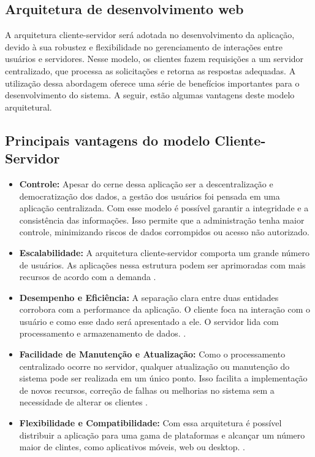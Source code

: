\subsection{Arquitetura de desenvolvimento web}

A arquitetura cliente-servidor será adotada no desenvolvimento da aplicação, devido à sua robustez e flexibilidade no gerenciamento de interações entre usuários e servidores. Nesse modelo, os clientes fazem requisições a um servidor centralizado, que processa as solicitações e retorna as respostas adequadas. A utilização dessa abordagem oferece uma série de benefícios importantes para o desenvolvimento do sistema. A seguir, estão algumas vantagens deste modelo arquitetural.

\subsection{Principais vantagens do modelo Cliente-Servidor}

\begin{itemize}
    \item \textbf{Controle:} Apesar do cerne dessa aplicação ser a descentralização e democratização dos dados, a gestão dos usuários foi pensada em uma aplicação centralizada. Com esse modelo é possível garantir a integridade e a consistência das informações. 
    Isso permite que a administração tenha maior controle, minimizando riscos de dados corrompidos ou acesso não autorizado\cite{coulouris2011}.
    
    \item \textbf{Escalabilidade:} A arquitetura cliente-servidor comporta um grande número de usuários. As aplicações nessa estrutura podem ser aprimoradas com mais recursos de acordo com a demanda \cite{coulouris2011}.
    
    \item \textbf{Desempenho e Eficiência:} A separação clara entre duas entidades corrobora com a performance da aplicação. O cliente foca na interação com o usuário e como esse dado será apresentado a ele. O servidor lida com processamento e armazenamento de dados. \cite{coulouris2011}.
    
    \item \textbf{Facilidade de Manutenção e Atualização:} Como o processamento centralizado ocorre no servidor, qualquer atualização ou manutenção do sistema pode ser realizada em um único ponto. Isso facilita a implementação de novos recursos, correção de falhas ou melhorias no sistema sem a necessidade de alterar os clientes \cite{coulouris2011}.
    
    \item \textbf{Flexibilidade e Compatibilidade:} Com essa arquitetura é possível distribuir a aplicação para uma gama de plataformas e alcançar um número maior de clintes, como aplicativos móveis, web ou desktop. \cite{coulouris2011}. 
\end{itemize}

